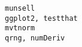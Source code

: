 \documentclass[
  letterpaper,
  DIV=11,
  numbers=noendperiod]{scrreprt}
\begin{document}
\begin{verbatim}
munsell                                                                                                                                                                                                                                                                                                                                                                                                                                                                                                                                                                                                                                                                                                                                                                                                                                                                                                                                                                                                                                                                                                                                                                                                                                                                                     ggplot2, testthat
mvtnorm                                                                                                                                                                                                                                                                                                                                                                                                                                                                                                                                                                                                                                                                                                                                                                                                                                                                                                                                                                                                                                                                                                                                                                                                                                                                                        qrng, numDeriv

\end{verbatim}
\end{document}
